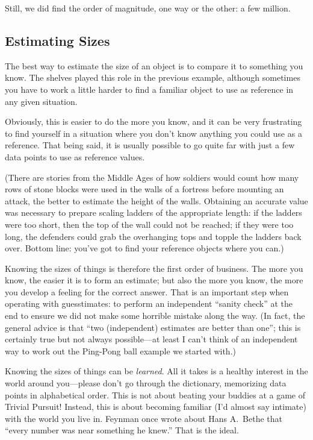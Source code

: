 Still, we did find the order of magnitude, one way or the other: a few
million.

\subsection{Estimating Sizes}

    
The best way to estimate the size of an object is to compare it to
something you know. The shelves played this role in the previous
example, although sometimes you have to work a little harder to find a
familiar object to use as reference in any given situation.
    
Obviously, this is easier to do the more you know, and it can be very
frustrating to find yourself in a situation\vadjust{\pagebreak} where you don't know
anything you could use as a reference. That being said, it is usually
possible to go quite far with just a few data points to use as
reference values.

(There are stories from the Middle Ages of how soldiers would count
how many rows of stone blocks were used in the walls of a fortress
before mounting an attack, the better to estimate the height of the
walls.  Obtaining an accurate value was necessary to prepare scaling
ladders of the appropriate length: if the ladders were too short, then
the top of the wall could not be reached; if they were too long, the
defenders could grab the overhanging tops and topple the ladders back
over. Bottom line: you've got to find your reference objects where you
can.)
    
Knowing the sizes of things is therefore the first order of business.
The more you know, the easier it is to form an estimate; but also the
more you know, the more you develop a feeling for the correct answer.
That is an important step when operating with guesstimates: to perform
an independent ``sanity check'' at the end to ensure we did not make
some horrible mistake along the way.  (In fact, the general advice is
that ``two (independent) estimates are better than one''; this is
certainly true but not always possible---at least I can't think of an
independent way to work out the Ping-Pong ball example we started
with.)
    
Knowing the sizes of things can be \emph{learned}. All it takes is a
healthy interest in the world around you---please don't go through the
dictionary, memorizing data points in alphabetical order.  This is not
about beating your buddies at a game of Trivial Pursuit!  Instead,
this is about becoming familiar (I'd almost say intimate) with the
world you live in.  Feynman once wrote about Hans A.\ Bethe that
``every number was near something he knew.'' That is the ideal.
   
